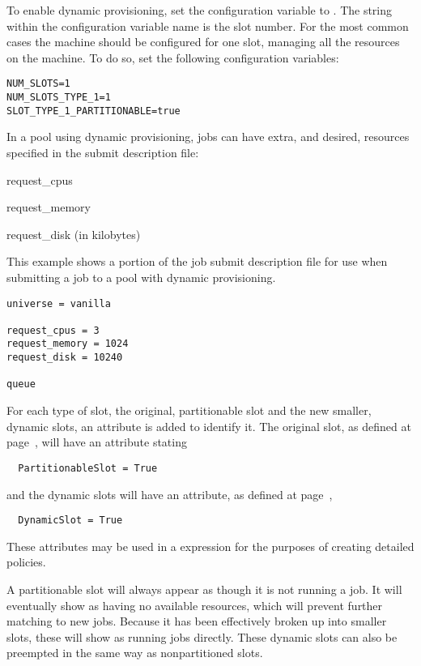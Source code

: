 To enable dynamic provisioning, 
set the  configuration variable 
to .
The string  within the configuration variable name
is the slot number.  For the most common cases the machine should
be configured for one slot, managing all the resources on the machine.
To do so, set the following configuration variables:

\begin{verbatim}
NUM_SLOTS=1
NUM_SLOTS_TYPE_1=1
SLOT_TYPE_1_PARTITIONABLE=true
\end{verbatim}

In a pool using dynamic provisioning, 
jobs can have extra, and desired, resources specified in the submit
description file:
\begin{description}
  \item{request\_cpus}
  \item{request\_memory}
  \item{request\_disk (in kilobytes)}
\end{description}

This example shows a portion of the job submit description file
for use when submitting a job to a pool with dynamic provisioning.
\begin{verbatim}
universe = vanilla

request_cpus = 3
request_memory = 1024
request_disk = 10240

queue 
\end{verbatim}

For each type of slot,
the original, partitionable slot and the new smaller, dynamic slots,
an attribute is added to identify it.
The original slot,
as defined at page~\pageref{PartitionableSlot-machine-attribute},
will have an attribute stating 
\begin{verbatim}
  PartitionableSlot = True
\end{verbatim}
and the dynamic slots will have an attribute, 
as defined at page~\pageref{DynamicSlot-machine-attribute},
\begin{verbatim}
  DynamicSlot = True
\end{verbatim}
These attributes may be used in a  expression for 
the purposes of creating detailed policies.

A partitionable slot will always appear as though it is not running a job.
It will eventually show as having no available resources, 
which will prevent further matching to new jobs.
Because it has been effectively broken up into smaller slots,
these will show as running jobs directly.
These dynamic slots can also be preempted in the same way as 
nonpartitioned slots.

